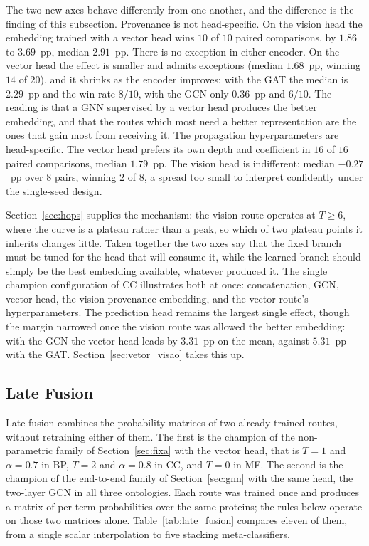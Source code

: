 \documentclass[Ingles]{ic-tese-v3}
\begin{document}
The two new axes behave differently from one another, and the difference is the finding of
this subsection.
Provenance is not head-specific. On the vision head the embedding trained with a
vector head wins $10$ of $10$ paired comparisons, by $1.86$ to $3.69$~pp, median
$2.91$~pp. There is no exception in either encoder. On the vector head the effect is
smaller and admits exceptions (median $1.68$~pp, winning $14$ of $20$), and it shrinks
as the encoder improves: with the GAT the median is $2.29$~pp and the win rate $8/10$, with
the GCN only $0.36$~pp and $6/10$. The reading is that a GNN supervised by a vector head
produces the better embedding, and that the routes which most need a better representation
are the ones that gain most from receiving it.
The propagation hyperparameters are head-specific. The vector head prefers its own
depth and coefficient in $16$ of $16$ paired comparisons, median $1.79$~pp. The vision head
is indifferent: median $-0.27$~pp over $8$ pairs, winning $2$ of $8$, a spread too small to interpret confidently under the single-seed design. 

Section~\ref{sec:hops} supplies the mechanism: the vision
route operates at $T \geq 6$, where the curve is a plateau rather than a peak, so which of
two plateau points it inherits changes little.
Taken together the two axes say that the fixed branch must be tuned for the head that will
consume it, while the learned branch should simply be the best embedding available,
whatever produced it. The single champion configuration of CC illustrates both at once:
concatenation, GCN, vector head, the vision-provenance embedding, and the vector route's hyperparameters.
The prediction head remains the largest single effect, though the margin narrowed once the
vision route was allowed the better embedding: with the GCN the vector head leads by
$3.31$~pp on the mean, against $5.31$~pp with the GAT. Section~\ref{sec:vetor_visao} takes
this up.

\subsection{Late Fusion}
\label{sec:late_fusion}

Late fusion combines the probability matrices of two already-trained routes, without
retraining either of them. The first is the champion of the non-parametric family of
Section~\ref{sec:fixa} with the vector head, that is $T=1$ and $\alpha=0.7$ in BP,
$T=2$ and $\alpha=0.8$ in CC, and $T=0$ in MF. The second is the champion of the
end-to-end family of Section~\ref{sec:gnn} with the same head, the two-layer GCN in all
three ontologies. Each route was trained once and produces a matrix of per-term
probabilities over the same proteins; the rules below operate on those two matrices alone.
Table~\ref{tab:late_fusion} compares eleven of them, from a single scalar interpolation to
five stacking meta-classifiers.
\end{document}
